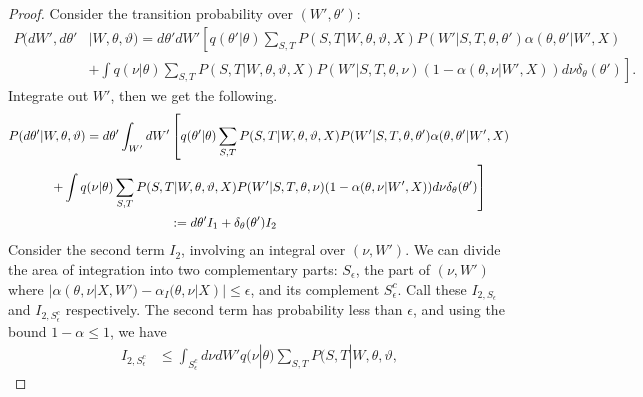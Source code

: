 \begin{proof}
Consider the transition probability over $(W',\theta')$:
\begin{align*}
  P(dW', d\theta'&| W, \theta, \vartheta) 
=d\theta' dW' \left[q(\theta' | \theta) 
  \sum_{S,T} P(S, T | W, \theta, \vartheta, X)P(W' | S, T, \theta, \theta')
\alpha(\theta, \theta' | W', X)\right. \\
&\left.+ \int q(\nu | \theta) \sum_{S,T} P(S, T|W,\theta,\vartheta,
    X)P(W' | S, T, \theta, \nu) ( 1 - {\alpha(\theta, \nu | W', X)})d\nu
    \delta_\theta(\theta')\right].
\end{align*}
Integrate out $W'$, then we get the following.
\begin{align*}
  P(d\theta'| W, \theta, \vartheta) =d\theta' \int_{W'}dW'&
  \left[q(\theta' | \theta)
    \sum_{S,T} P(S, T | W, \theta, \vartheta, X)P(W' | S, T, \theta,
  \theta')\alpha(\theta, \theta' | W', X)\right.\\
  &\hspace{-1.3in}\left.  + \int q(\nu | \theta) \sum_{S,T} P(S, T |  W, \theta, \vartheta,
X)P(W' | S, T, \theta, \nu) ( 1 - \alpha(\theta, \nu | W', X))d\nu
\delta_\theta(\theta')\right] \\
&:= d\theta' I_1 + \delta_\theta(\theta')I_2
\end{align*}
{Consider the second term $I_2$, involving an integral over $(\nu,W')$. 
  We can divide the area of integration into two complementary 
  parts: $S_{\epsilon}$, the part of $(\nu,W')$ where 
  $|\alpha(\theta, \nu | X,W') - \alpha_I(\theta, \nu | X)| \le \epsilon$,
and its complement $S^c_{\epsilon}$. Call these $I_{2,S_{\epsilon}}$ and 
$I_{2,S_{\epsilon}^c}$ respectively. 
The second term has probability less than $\epsilon$, and using the bound 
$1-\alpha \le 1$, we have}
\begin{align*}
  I_{2,S_{\epsilon}^c} &\le \int_{S^c_{\epsilon}} d\nu dW'
q(\nu | \theta) \sum_{S,T} P(S, T |  W, \theta, \vartheta,

\end{align*}
\end{proof}
